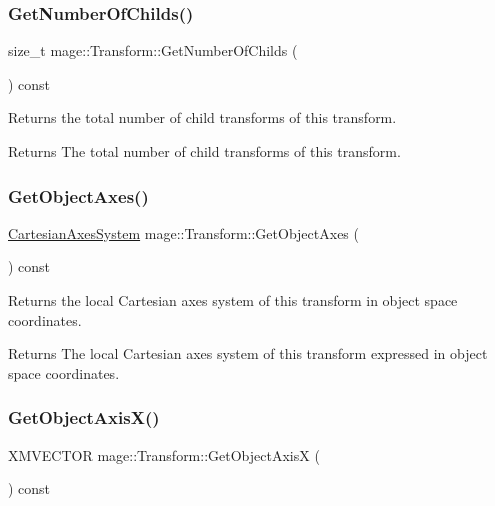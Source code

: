 \subsubsection{\texorpdfstring{Get\+Number\+Of\+Childs()}{GetNumberOfChilds()}}
{\footnotesize\ttfamily size\+\_\+t mage\+::\+Transform\+::\+Get\+Number\+Of\+Childs (\begin{DoxyParamCaption}{ }\end{DoxyParamCaption}) const}

Returns the total number of child transforms of this transform.

\begin{DoxyReturn}{Returns}
The total number of child transforms of this transform. 
\end{DoxyReturn}
\hypertarget{structmage_1_1_transform_a814f749d70104ec5732a741b0b2b7220}{}\label{structmage_1_1_transform_a814f749d70104ec5732a741b0b2b7220} 
\subsubsection{\texorpdfstring{Get\+Object\+Axes()}{GetObjectAxes()}}
{\footnotesize\ttfamily \hyperlink{structmage_1_1_cartesian_axes_system}{Cartesian\+Axes\+System} mage\+::\+Transform\+::\+Get\+Object\+Axes (\begin{DoxyParamCaption}{ }\end{DoxyParamCaption}) const}

Returns the local Cartesian axes system of this transform in object space coordinates.

\begin{DoxyReturn}{Returns}
The local Cartesian axes system of this transform expressed in object space coordinates. 
\end{DoxyReturn}
\hypertarget{structmage_1_1_transform_a1817e9ff4397b5a107541b92a01b91fc}{}\label{structmage_1_1_transform_a1817e9ff4397b5a107541b92a01b91fc} 
\subsubsection{\texorpdfstring{Get\+Object\+Axis\+X()}{GetObjectAxisX()}}
{\footnotesize\ttfamily X\+M\+V\+E\+C\+T\+OR mage\+::\+Transform\+::\+Get\+Object\+AxisX (\begin{DoxyParamCaption}{ }\end{DoxyParamCaption}) const}

